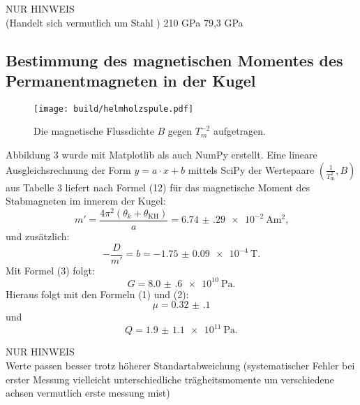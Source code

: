 NUR HINWEIS\\
(Handelt sich vermutlich um Stahl \cite[624\psq]{TaschenbuchPhysik}) 210 GPa
\cite{EinführungMechanik}  	79,3 GPa






\subsection{Bestimmung des magnetischen Momentes des Permanentmagneten in der Kugel}
\begin{figure}[H]
	\centering
	\caption{Die magnetische Flussdichte $B$ gegen $T_m ^{-2}$ aufgetragen.}
	\texttt{[image: build/helmholzspule.pdf]}
	\label{fig:grad3}
\end{figure}

Abbildung 3 wurde mit Matplotlib \cite{matplotlib} als auch NumPy \cite{numpy} erstellt.
Eine lineare Ausgleichsrechnung der Form $y = a \cdot x + b$ mittels SciPy \cite{scipy} der Wertepaare $\left(\frac{1}{T_\text{m}^2}, B\right)$ aus Tabelle 3 liefert nach Formel (12) für das magnetische Moment des Stabmagneten im innerem der Kugel:
\begin{displaymath}
	m' = \frac{4 \pi ^2 (\theta_k + \theta_{\text{KH}})}{a} = \SI{6.74(29)e-2}{\ampere\meter\squared}\text{,}
\end{displaymath}
und zusätzlich:
\begin{displaymath} 
	-\frac{D}{m'} = b =  \SI{-1.75(9)e-4}{\tesla}\text{.}
\end{displaymath}
Mit Formel (3) folgt:
\begin{displaymath} 
	G =  \SI{8.0(6)e10}{\pascal}\text{.}
\end{displaymath}
Hieraus folgt mit den Formeln (1) und (2):
\begin{displaymath}
	\mu = \num{0.32(10)}
\end{displaymath}
und
\begin{displaymath} 
	Q =  \SI{1.9(11)e11}{\pascal}\text{.}
\end{displaymath}

NUR HINWEIS\\
Werte passen besser trotz höherer Standartabweichung (systematischer Fehler bei erster Messung vielleicht unterschiedliche trägheitsmomente um verschiedene achsen vermutlich erste messung mist)





